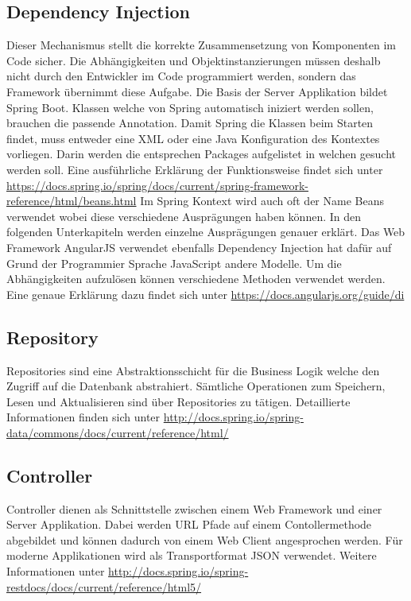 \subsection{Dependency Injection}

Dieser Mechanismus stellt die korrekte Zusammensetzung von Komponenten im Code sicher. Die Abhängigkeiten und Objektinstanzierungen  müssen deshalb nicht durch den Entwickler im Code programmiert werden, sondern das Framework übernimmt diese Aufgabe. Die Basis der Server Applikation bildet Spring Boot. Klassen welche von Spring automatisch iniziert werden sollen, brauchen die passende Annotation.
Damit Spring die Klassen beim Starten findet, muss entweder eine XML oder eine Java Konfiguration des Kontextes vorliegen. Darin werden die entsprechen Packages aufgelistet in welchen gesucht werden soll. Eine ausführliche Erklärung der Funktionsweise findet sich unter \url{https://docs.spring.io/spring/docs/current/spring-framework-reference/html/beans.html}\newline
Im Spring Kontext wird auch oft der Name Beans verwendet wobei diese verschiedene Ausprägungen haben können. In den folgenden Unterkapiteln werden einzelne Ausprägungen genauer erklärt.\newline
Das Web Framework AngularJS verwendet ebenfalls Dependency Injection hat dafür auf Grund der Programmier Sprache JavaScript andere Modelle. Um die Abhängigkeiten aufzulösen können verschiedene Methoden verwendet werden. Eine genaue Erklärung dazu findet sich unter \url{https://docs.angularjs.org/guide/di}

\subsection{Repository}

Repositories sind eine Abstraktionsschicht für die Business Logik welche den Zugriff auf die Datenbank abstrahiert. Sämtliche Operationen zum Speichern, Lesen und Aktualisieren sind über Repositories zu tätigen.  Detaillierte Informationen finden sich unter \url{http://docs.spring.io/spring-data/commons/docs/current/reference/html/}

\subsection{Controller}

Controller dienen als Schnittstelle zwischen einem Web Framework und einer Server Applikation. Dabei werden URL Pfade auf einem Contollermethode abgebildet und können dadurch von einem Web Client angesprochen werden. Für moderne Applikationen wird als Transportformat JSON verwendet. Weitere Informationen unter \url{http://docs.spring.io/spring-restdocs/docs/current/reference/html5/}

